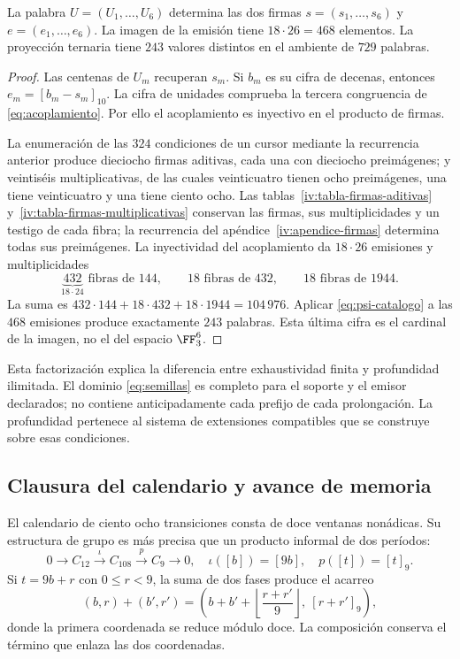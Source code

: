 \begin{proposition}
La palabra \(U=(U_1,\ldots,U_6)\) determina las dos firmas \(s=(s_1,\ldots,s_6)\) y \(e=(e_1,\ldots,e_6)\). La imagen de la emisión tiene \(18\cdot26=468\) elementos. La proyección ternaria tiene \(243\) valores distintos en el ambiente de \(729\) palabras.
\end{proposition}
\begin{proof}
Las centenas de \(U_m\) recuperan \(s_m\). Si \(b_m\) es su cifra de decenas, entonces \(e_m=[b_m-s_m]_{10}\). La cifra de unidades comprueba la tercera congruencia de \eqref{eq:acoplamiento}. Por ello el acoplamiento es inyectivo en el producto de firmas.

La enumeración de las \(324\) condiciones de un cursor mediante la recurrencia anterior produce dieciocho firmas aditivas, cada una con dieciocho preimágenes; y veintiséis multiplicativas, de las cuales veinticuatro tienen ocho preimágenes, una tiene veinticuatro y una tiene ciento ocho. Las tablas~\ref{iv:tabla-firmas-aditivas}
y~\ref{iv:tabla-firmas-multiplicativas} conservan las firmas, sus
multiplicidades y un testigo de cada fibra; la recurrencia del
apéndice~\ref{iv:apendice-firmas} determina todas sus preimágenes.
La inyectividad del acoplamiento da \(18\cdot26\) emisiones y multiplicidades
\[
 \underbrace{432}_{18\cdot24}\text{ fibras de }144,
 \qquad18\text{ fibras de }432,
 \qquad18\text{ fibras de }1944.
\]
La suma es \(432\cdot144+18\cdot432+18\cdot1944=104\,976\). Aplicar \eqref{eq:psi-catalogo} a las \(468\) emisiones produce exactamente \(243\) palabras. Esta última cifra es el cardinal de la imagen, no el del espacio \(\FF_3^6\).
\end{proof}

Esta factorización explica la diferencia entre exhaustividad finita y profundidad ilimitada. El dominio \eqref{eq:semillas} es completo para el soporte y el emisor declarados; no contiene anticipadamente cada prefijo de cada prolongación. La profundidad pertenece al sistema de extensiones compatibles que se construye sobre esas condiciones.

\subsection{Clausura del calendario y avance de memoria}

El calendario de ciento ocho transiciones consta de doce ventanas nonádicas. Su estructura de grupo es más precisa que un producto informal de dos períodos:
\begin{equation}
 0\longrightarrow C_{12}\xrightarrow{\iota}C_{108}
 \xrightarrow{p}C_9\longrightarrow0,
 \quad\iota([b])=[9b],\quad p([t])=[t]_9.
 \label{eq:extension108}
\end{equation}
Si \(t=9b+r\) con \(0\le r<9\), la suma de dos fases produce el acarreo
\[
 (b,r)+(b',r')=
 \left(b+b'+\left\lfloor\frac{r+r'}9\right\rfloor,\ [r+r']_9\right),
\]
donde la primera coordenada se reduce módulo doce. La composición conserva el término que enlaza las dos coordenadas.


